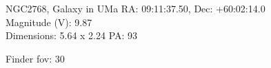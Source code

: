 \begin{block}{NGC2768, Galaxy in UMa}
    RA: 09:11:37.50, Dec: +60:02:14.0 \\ 
    Magnitude (V): 9.87 \\ 
    Dimensions: 5.64 x 2.24 PA: 93 

    Finder fov: 30 
\end{block}